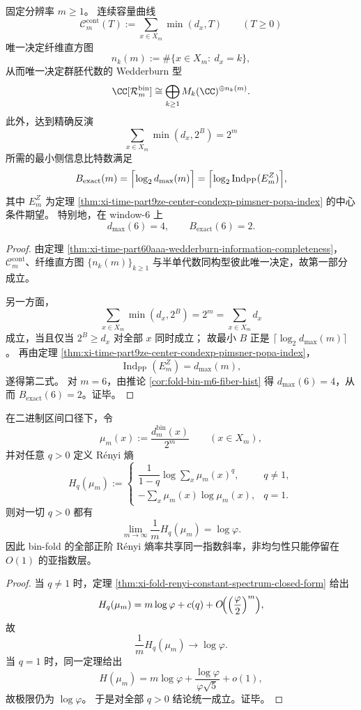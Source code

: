 \begin{corollary}\label{cor:conclusion-fold-capacity-wedderburn-exact-bit-threshold}
固定分辨率 \(m\ge 1\)。
连续容量曲线
\[
\mathcal C_m^{\mathrm{cont}}(T):=\sum_{x\in X_m}\min(d_x,T)
\qquad (T\ge 0)
\]
唯一决定纤维直方图
\[
n_k(m):=\#\{x\in X_m:\ d_x=k\},
\]
从而唯一决定群胚代数的 Wedderburn 型
\[
\CC[\mathcal R_m^{\mathrm{bin}}]
\cong
\bigoplus_{k\ge 1}M_k(\CC)^{\oplus n_k(m)}.
\]
此外，达到精确反演
\[
\sum_{x\in X_m}\min(d_x,2^B)=2^m
\]
所需的最小侧信息比特数满足
\[
B_{\mathrm{exact}}(m)
=
\Bigl\lceil \log_2 d_{\max}(m)\Bigr\rceil
=
\Bigl\lceil \log_2 \operatorname{Ind}_{\mathrm{PP}}(E_m^Z)\Bigr\rceil,
\]
其中 \(E_m^Z\) 为定理 \ref{thm:xi-time-part9ze-center-condexp-pimsner-popa-index} 的中心条件期望。
特别地，在 window-\(6\) 上
\[
d_{\max}(6)=4,
\qquad
B_{\mathrm{exact}}(6)=2.
\]
\end{corollary}
\begin{proof}
由定理 \ref{thm:xi-time-part60aaa-wedderburn-information-completeness}，
\(\mathcal C_m^{\mathrm{cont}}\)、纤维直方图 \(\{n_k(m)\}_{k\ge 1}\) 与半单代数同构型彼此唯一决定，故第一部分成立。

另一方面，
\[
\sum_{x\in X_m}\min(d_x,2^B)=2^m=\sum_{x\in X_m}d_x
\]
成立，当且仅当 \(2^B\ge d_x\) 对全部 \(x\) 同时成立；
故最小 \(B\) 正是 \(\lceil\log_2 d_{\max}(m)\rceil\)。
再由定理 \ref{thm:xi-time-part9ze-center-condexp-pimsner-popa-index}，
\[
\operatorname{Ind}_{\mathrm{PP}}(E_m^Z)=d_{\max}(m),
\]
遂得第二式。
对 \(m=6\)，由推论 \ref{cor:fold-bin-m6-fiber-hist} 得 \(d_{\max}(6)=4\)，从而 \(B_{\mathrm{exact}}(6)=2\)。证毕。
\end{proof}

\begin{corollary}\label{cor:conclusion-binfold-renyi-rate-collapse}
在二进制区间口径下，令
\[
\mu_m(x):=\frac{d_m^{\mathrm{bin}}(x)}{2^m}
\qquad(x\in X_m),
\]
并对任意 \(q>0\) 定义 Rényi 熵
\[
H_q(\mu_m):=
\begin{cases}
\dfrac{1}{1-q}\log\sum_x \mu_m(x)^q,& q\neq 1,\\[1ex]
-\sum_x \mu_m(x)\log\mu_m(x),& q=1.
\end{cases}
\]
则对一切 \(q>0\) 都有
\[
\lim_{m\to\infty}\frac{1}{m}H_q(\mu_m)=\log\varphi.
\]
因此 bin-fold 的全部正阶 Rényi 熵率共享同一指数斜率，非均匀性只能停留在 \(O(1)\) 的亚指数层。
\end{corollary}
\begin{proof}
当 \(q\neq 1\) 时，定理 \ref{thm:xi-fold-renyi-constant-spectrum-closed-form} 给出
\[
H_q(\mu_m)=m\log\varphi+c(q)+O\!\Bigl(\Bigl(\frac{\varphi}{2}\Bigr)^m\Bigr),
\]
故
\[
\frac{1}{m}H_q(\mu_m)\to \log\varphi.
\]
当 \(q=1\) 时，同一定理给出
\[
H(\mu_m)=m\log\varphi+\frac{\log\varphi}{\varphi\sqrt 5}+o(1),
\]
故极限仍为 \(\log\varphi\)。
于是对全部 \(q>0\) 结论统一成立。证毕。
\end{proof}

